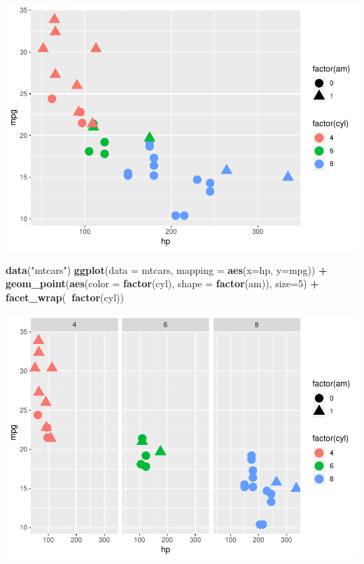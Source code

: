 \documentclass[]{article}
\newenvironment{Shaded}{\begin{snugshade}}{\end{snugshade}}
\newcommand{\KeywordTok}[1]{\textcolor[rgb]{0.13,0.29,0.53}{\textbf{#1}}}
\newcommand{\DataTypeTok}[1]{\textcolor[rgb]{0.13,0.29,0.53}{#1}}
\newcommand{\DecValTok}[1]{\textcolor[rgb]{0.00,0.00,0.81}{#1}}
\newcommand{\StringTok}[1]{\textcolor[rgb]{0.31,0.60,0.02}{#1}}
\newcommand{\OperatorTok}[1]{\textcolor[rgb]{0.81,0.36,0.00}{\textbf{#1}}}
\newcommand{\NormalTok}[1]{#1}
\begin{document}
\includegraphics{stt-301-programming_files/figure-latex/unnamed-chunk-55-1.pdf}

\begin{Shaded}
\begin{Highlighting}[]
\KeywordTok{data}\NormalTok{(}\StringTok{"mtcars"}\NormalTok{)}
\KeywordTok{ggplot}\NormalTok{(}\DataTypeTok{data =}\NormalTok{ mtcars,}
       \DataTypeTok{mapping =} \KeywordTok{aes}\NormalTok{(}\DataTypeTok{x=}\NormalTok{hp, }\DataTypeTok{y=}\NormalTok{mpg)) }\OperatorTok{+}
\StringTok{  }\KeywordTok{geom_point}\NormalTok{(}\KeywordTok{aes}\NormalTok{(}\DataTypeTok{color =} \KeywordTok{factor}\NormalTok{(cyl),}
                 \DataTypeTok{shape =} \KeywordTok{factor}\NormalTok{(am)),}
             \DataTypeTok{size=}\DecValTok{5}\NormalTok{) }\OperatorTok{+}
\StringTok{  }\KeywordTok{facet_wrap}\NormalTok{(}\OperatorTok{~}\KeywordTok{factor}\NormalTok{(cyl))}
\end{Highlighting}
\end{Shaded}

\includegraphics{stt-301-programming_files/figure-latex/unnamed-chunk-55-2.pdf}
\end{document}

